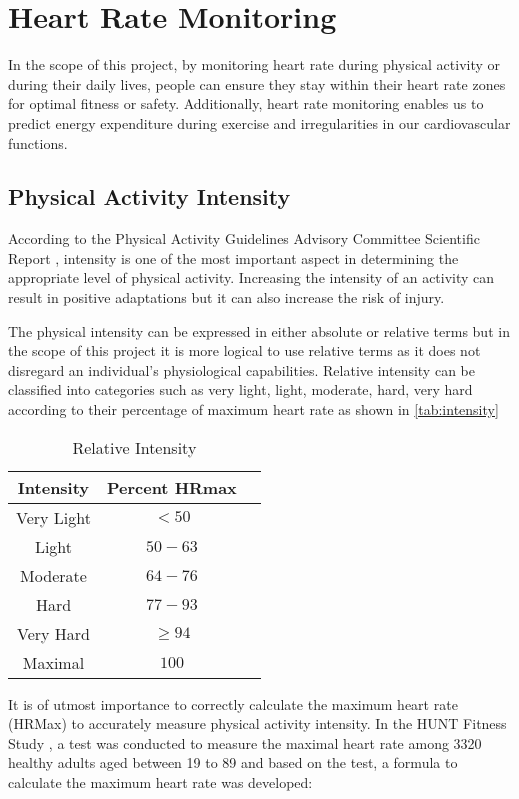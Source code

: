 \section{Heart Rate Monitoring}
In the scope of this project, by monitoring heart rate during physical activity or during their daily lives, people can ensure they stay within their heart rate zones for optimal fitness or safety.
Additionally, heart rate monitoring enables us to predict energy expenditure during exercise and irregularities in our cardiovascular functions.

\subsection{Physical Activity Intensity}
\label{chap:activity_intensity}
According to the Physical Activity Guidelines Advisory Committee Scientific Report \autocite{healthgov2008}, intensity is one of the most important aspect in determining the appropriate level of physical activity.
Increasing the intensity of an activity can result in positive adaptations but it can also increase the risk of injury. 

The physical intensity can be expressed in either absolute or relative terms but in the scope of this project it is more logical to use relative terms as it does not disregard an individual's physiological capabilities. 
Relative intensity can be classified into categories such as very light, light, moderate, hard, very hard according to their percentage of maximum heart rate as shown in \autoref{tab:intensity} \autocite{healthgov2008}

\begin{table}[htbp]
    \centering
    \begin{tabular}{|c|c|c|}
      \hline
      \textbf{Intensity} & \textbf{Percent HRmax} \\
      \hline
      Very Light & $<50$ \\
      Light & $50-63$ \\
      Moderate & $64-76$ \\
      Hard & $77-93$ \\
      Very Hard & $\geq94$ \\
      Maximal & $100$ \\
      \hline
    \end{tabular}
    \caption{Relative Intensity \autocite{healthgov2008}}
    \label{tab:intensity}
  \end{table}
  
It is of utmost importance to correctly calculate the maximum heart rate (HRMax) to accurately measure physical activity intensity. In the HUNT Fitness Study \autocite{nes2013maximal}, a test was conducted to measure the maximal heart rate among 3320 healthy adults aged between 19 to 89 and based on the test, a formula to calculate the maximum heart rate was developed: 

